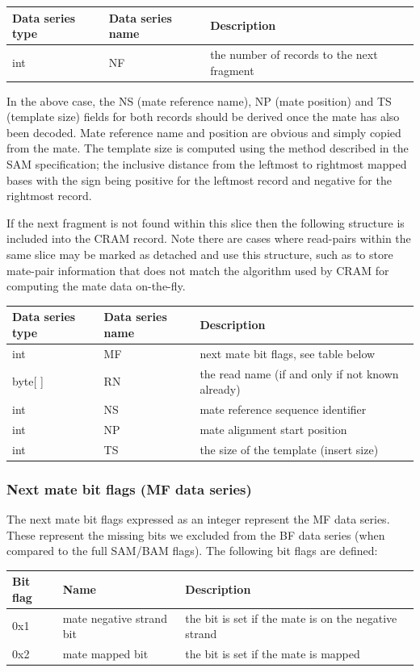 \documentclass[a4paper]{article}
\begin{document}
\begin{tabular}{|>{\raggedright}p{68pt}|>{\raggedright}p{115pt}|>{\raggedright}p{228pt}|}
\hline
\textbf{Data series type} & \textbf{Data series name} & \textbf{Description}\tabularnewline
\hline
int & NF & the number of records to the next fragment\tabularnewline
\hline
\end{tabular}

In the above case, the NS (mate reference name), NP (mate position) and TS (template size) fields for both records should be derived once the mate has also been decoded.
Mate reference name and position are obvious and simply copied from the mate.
The template size is computed using the method described in the SAM specification; the inclusive distance from the leftmost to rightmost mapped bases with the sign being positive for the leftmost record and negative for the rightmost record.

If the next fragment is not found within this slice then the following structure is included into the CRAM record.
Note there are cases where read-pairs within the same slice may be marked as detached and use this structure, such as to store mate-pair information that does not match the algorithm used by CRAM for computing the mate data on-the-fly.

\begin{tabular}{|>{\raggedright}p{66pt}|>{\raggedright}p{117pt}|>{\raggedright}p{228pt}|}
\hline
\textbf{Data series type} & \textbf{Data series name} & \textbf{Description}\tabularnewline
\hline
int & MF & next mate bit flags, see table below\tabularnewline
\hline
byte[ ] & RN & the read name (if and only if not known already)\tabularnewline
\hline
int & NS & mate reference sequence identifier \tabularnewline
\hline
int & NP & mate alignment start position \tabularnewline
\hline
int & TS & the size of the template (insert size)\tabularnewline
\hline
\end{tabular}

\subsubsection*{Next mate bit flags (MF data series)}

The next mate bit flags expressed as an integer represent the MF data series.
These represent the missing bits we excluded from the BF data series (when compared to the full SAM/BAM flags).
The following bit flags are defined:

\begin{tabular}{|>{\raggedright}p{47pt}|>{\raggedright}p{134pt}|>{\raggedright}p{250pt}|}
\hline
\textbf{Bit flag} & \textbf{Name} & \textbf{Description}\tabularnewline
\hline
0x1 & mate negative strand bit & the bit is set if the mate is on the negative
strand\tabularnewline
\hline
0x2 & mate mapped bit & the bit is set if the mate is mapped\tabularnewline
\hline
\end{tabular}
\end{document}
